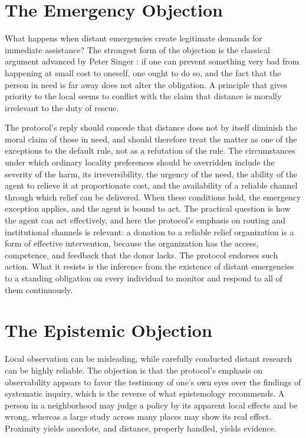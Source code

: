 \documentclass[11pt]{report}
\theoremstyle{definition}
\theoremstyle{remark}
\begin{document}
\section{The Emergency Objection}

What happens when distant emergencies create legitimate demands for immediate assistance? The strongest form of the objection is the classical argument advanced by Peter Singer \cite{singer}: if one can prevent something very bad from happening at small cost to oneself, one ought to do so, and the fact that the person in need is far away does not alter the obligation. A principle that gives priority to the local seems to conflict with the claim that distance is morally irrelevant to the duty of rescue.

The protocol's reply should concede that distance does not by itself diminish the moral claim of those in need, and should therefore treat the matter as one of the exceptions to the default rule, not as a refutation of the rule. The circumstances under which ordinary locality preferences should be overridden include the severity of the harm, its irreversibility, the urgency of the need, the ability of the agent to relieve it at proportionate cost, and the availability of a reliable channel through which relief can be delivered. When these conditions hold, the emergency exception applies, and the agent is bound to act. The practical question is how the agent can act effectively, and here the protocol's emphasis on routing and institutional channels is relevant: a donation to a reliable relief organization is a form of effective intervention, because the organization has the access, competence, and feedback that the donor lacks. The protocol endorses such action. What it resists is the inference from the existence of distant emergencies to a standing obligation on every individual to monitor and respond to all of them continuously.

\section{The Epistemic Objection}

Local observation can be misleading, while carefully conducted distant research can be highly reliable. The objection is that the protocol's emphasis on observability appears to favor the testimony of one's own eyes over the findings of systematic inquiry, which is the reverse of what epistemology recommends. A person in a neighborhood may judge a policy by its apparent local effects and be wrong, whereas a large study across many places may show its real effect. Proximity yields anecdote, and distance, properly handled, yields evidence.
\end{document}
